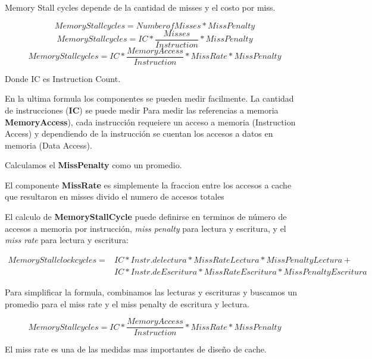 \documentclass{article}
\begin{document}
Memory Stall cycles depende de la cantidad de misses y el costo por miss.

    \begin{equation}
        Memory Stall cycles = Number of Misses * Miss Penalty
    \end{equation}
    \begin{equation}
        Memory Stall cycles = IC * \frac{Misses}{Instruction} * Miss Penalty
    \end{equation}
    \begin{equation}
        Memory Stall cycles = IC * \frac{MemoryAccess}{Instruction} * MissRate * Miss Penalty
    \end{equation}


Donde IC es Instruction Count. 

En la ultima formula los componentes se pueden medir facilmente. La cantidad de instrucciones (\textbf{IC}) se puede medir
Para medir las referencias a memoria \textbf{MemoryAccess}), cada instrucción requeiere un acceso a memoria (Instruction Access) y 
dependiendo de la instrucción se cuentan los accesos a datos en memoria (Data Access).

Calculamos el \textbf{MissPenalty} como un promedio.

El componente \textbf{MissRate} es simplemente la fraccion entre los accesos a cache que resultaron en misses 
divido el numero de accesos totales


El calculo de \textbf{MemoryStallCycle} puede definirse en terminos de número de accesos a memoria por instrucción, \textit{miss penalty} para lectura y escritura, y el \textit{miss rate} para lectura y escritura:

\begin{align*}
Memory Stall clock cycles = &IC * Instr. de lectura * MissRate Lectura * MissPenaltyLectura + \\
&IC * Instr. de Escritura * MissRateEscritura * MissPenaltyEscritura
\end{align*}

Para simplificar la formula, combinamos las lecturas y escrituras y buscamos un promedio para el miss rate y el miss penalty de escritura y lectura.

\begin{equation}
    Memory Stall cycles = IC * \frac{MemoryAccess}{Instruction} * MissRate * Miss Penalty
\end{equation}

El miss rate es una de las medidas mas importantes de diseño de cache.
\end{document}
